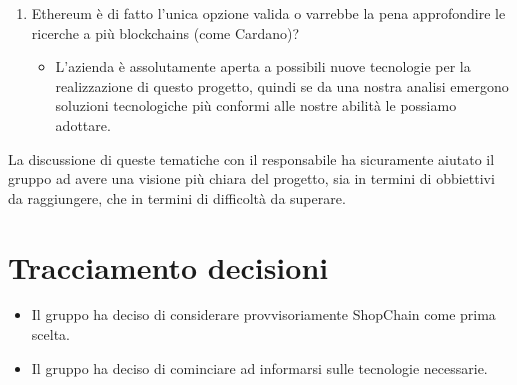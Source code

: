 \begin{enumerate}
            \begin{itemize}
                \item L'utente viene identificato unicamente dall'address del suo wallet, sia dal punto di vista dell'acquirente che dal punto di vista del venditore. Non avremo bisogno di
                      mantenere traccia di altre informazioni, quali: nomi, cognomi, anno di nascita ecc per due motivazioni:
                      \begin{itemize}
                          \item \'E sicuramente un costo in più, visto che si andrebbero ad aggiungere dati nella blockchain.
                          \item Utenti esterni potrebbero entrare nella blockchain e leggere i dati personali di altri utenti, facendo venire a meno il fattore di anonimità caratteristico delle blockchains
                      \end{itemize}
            \end{itemize}
    \item Ethereum è di fatto l'unica opzione valida o varrebbe la pena approfondire le ricerche a più blockchains (come Cardano)?
            \begin{itemize}
                \item L'azienda è assolutamente aperta a possibili nuove tecnologie per la realizzazione di questo progetto, quindi se da una nostra analisi emergono soluzioni tecnologiche più conformi alle nostre abilità le possiamo adottare.
            \end{itemize}
\end{enumerate}
La discussione di queste tematiche con il responsabile ha sicuramente aiutato il gruppo ad avere una visione più chiara del progetto,
sia in termini di obbiettivi da raggiungere, che in termini di difficoltà da superare.
\section{Tracciamento decisioni}
\begin{itemize}
    \item Il gruppo ha deciso di considerare provvisoriamente ShopChain come prima scelta.
    \item Il gruppo ha deciso di cominciare ad informarsi sulle tecnologie necessarie.
\end{itemize}